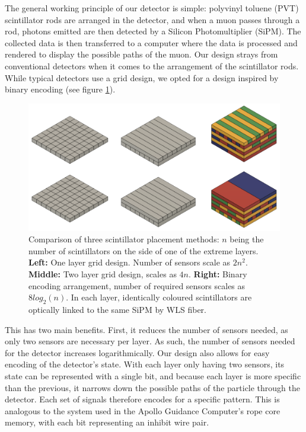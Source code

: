 
The general working principle of our detector is simple:
polyvinyl toluene (PVT) scintillator rods are arranged in
the detector, and when a muon passes through a rod, photons emitted are then detected by a Silicon Photomultiplier
(SiPM). The collected data is then transferred to a computer where the data is processed and rendered to display the possible paths of the muon. Our design strays from conventional detectors when it comes to the arrangement of the scintillator rods. While typical detectors use a grid design, we opted for a design inspired by binary encoding (see figure \ref{fig0}). 


\begin{figure}[h]
    \centering
    \includegraphics[scale=0.46]{figures/sandwich good.png}
\caption{Comparison of three scintillator placement methods: $n$ being the number of scintillators on the side of
one of the extreme layers. 
\textbf{Left:} One layer grid design. Number of sensors scale as $2n^2$.
\textbf{Middle:} Two layer grid design, scales as $4n$.
\textbf{Right:} Binary
encoding arrangement, number of required sensors scales as
$8 log_2(n)$. In each layer, identically coloured
scintillators are optically linked to the same SiPM by WLS
fiber.}
\label{fig0}
\end{figure}



This has two main benefits. First, it reduces the number of sensors needed, as only two sensors are necessary per layer. As such, the number of sensors needed for the detector increases logarithmically. Our design also allows for easy encoding of the detector’s state. With each layer only having two sensors, its state can be represented with a single bit, and because each layer is more specific than the previous, it narrows down the possible paths of the particle through the detector. Each set of signals therefore encodes for a specific pattern. This is analogous to the system used in the Apollo Guidance Computer’s rope core memory, with each bit representing an inhibit wire pair\cite{agc}.


